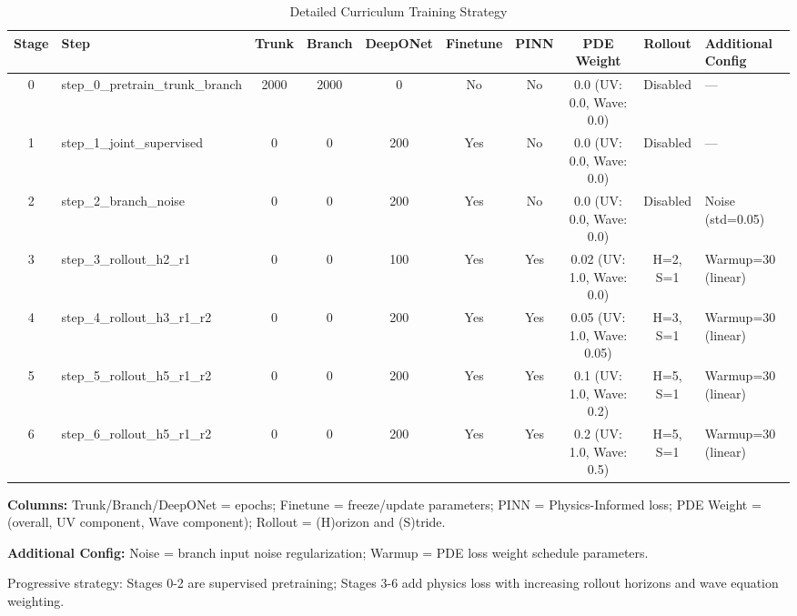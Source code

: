 \begin{landscape}
\begin{table}[h!]
\centering
\caption{Detailed Curriculum Training Strategy}
\label{tab:curriculum_detailed}
\tiny
\begin{tabularx}{\linewidth}{|c|l|c|c|c|c|c|c|c|l|}
\hline
\textbf{Stage} & \textbf{Step} & \textbf{Trunk} & \textbf{Branch} & \textbf{DeepONet} & \textbf{Finetune} & \textbf{PINN} & \textbf{PDE Weight} & \textbf{Rollout} & \textbf{Additional Config} \\
\hline
0 & step\_0\_pretrain\_trunk\_branch & 2000 & 2000 & 0 & No & No & 0.0 (UV: 0.0, Wave: 0.0) & Disabled & --- \\
1 & step\_1\_joint\_supervised & 0 & 0 & 200 & Yes & No & 0.0 (UV: 0.0, Wave: 0.0) & Disabled & --- \\
2 & step\_2\_branch\_noise & 0 & 0 & 200 & Yes & No & 0.0 (UV: 0.0, Wave: 0.0) & Disabled & Noise (std=0.05) \\
3 & step\_3\_rollout\_h2\_r1 & 0 & 0 & 100 & Yes & Yes & 0.02 (UV: 1.0, Wave: 0.0) & H=2, S=1 & Warmup=30 (linear) \\
4 & step\_4\_rollout\_h3\_r1\_r2 & 0 & 0 & 200 & Yes & Yes & 0.05 (UV: 1.0, Wave: 0.05) & H=3, S=1 & Warmup=30 (linear) \\
5 & step\_5\_rollout\_h5\_r1\_r2 & 0 & 0 & 200 & Yes & Yes & 0.1 (UV: 1.0, Wave: 0.2) & H=5, S=1 & Warmup=30 (linear) \\
6 & step\_6\_rollout\_h5\_r1\_r2 & 0 & 0 & 200 & Yes & Yes & 0.2 (UV: 1.0, Wave: 0.5) & H=5, S=1 & Warmup=30 (linear) \\
\hline
\end{tabularx}
\vspace{0.5em}
\begin{tablenotes}
\tiny
\item \textbf{Columns:} Trunk/Branch/DeepONet = epochs; Finetune = freeze/update parameters; PINN = Physics-Informed loss; PDE Weight = (overall, UV component, Wave component); Rollout = (H)orizon and (S)tride.
\item \textbf{Additional Config:} Noise = branch input noise regularization; Warmup = PDE loss weight schedule parameters.
\item Progressive strategy: Stages 0-2 are supervised pretraining; Stages 3-6 add physics loss with increasing rollout horizons and wave equation weighting.
\end{tablenotes}
\end{table}
\end{landscape}